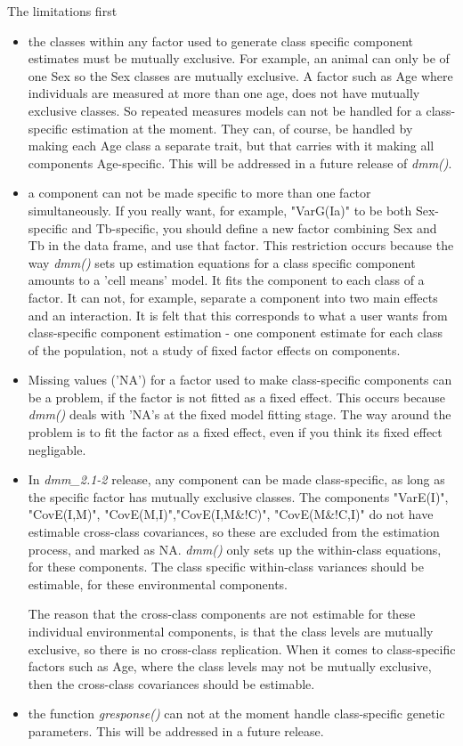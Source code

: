 \documentclass[titlepage]{article}  %
\begin{document}
The limitations first
\begin{itemize}
\item the classes within any factor used to generate class specific component estimates must be mutually exclusive. For example, an animal can only be of one Sex so the Sex classes are mutually exclusive. A factor such as Age where individuals are measured at more than one age, does not have mutually exclusive classes. So repeated measures models can not be handled for a class-specific estimation at the moment. They can, of course, be handled by making each Age class a separate trait, but that carries with it making all components Age-specific.
This will be addressed in a future release of {\em dmm()}.
\item a component can not be made specific to more than one factor simultaneously. If you really want, for example, "VarG(Ia)" to be both Sex-specific and Tb-specific, you should define a new factor combining Sex and Tb in the data frame, and use that factor. This restriction occurs because the way {\em dmm()} sets up estimation equations for a class specific component amounts to a 'cell means' model. It fits the component to each class of a factor. It can not, for example, separate a component into two main effects and an interaction. It is felt that this corresponds to what a user wants from class-specific component estimation - one component estimate for each class of the population, not a study of fixed factor effects on components.
\item Missing values ('NA') for a factor used to make class-specific components can be a problem, if the factor is not fitted as a fixed effect. This occurs because {\em dmm()} deals with 'NA's at the fixed model fitting stage. The way around the problem is to fit the factor as a fixed effect, even if you think its fixed effect negligable.
\item In {\em dmm\_2.1-2} release, any component can be made class-specific, as long as the specific factor has mutually exclusive classes. The components "VarE(I)",  "CovE(I,M)", "CovE(M,I)","CovE(I,M\&!C)", "CovE(M\&!C,I)" do not have estimable cross-class covariances, so these are excluded from the estimation process, and marked as NA.  {\em dmm()} only sets up  the within-class equations, for these components. The class specific within-class variances should be estimable, for these environmental components.

   The reason that the cross-class components are not estimable for these individual environmental components, is that the class levels are mutually exclusive, so there is no cross-class replication. When it comes to class-specific factors such as Age, where the class levels may not be mutually exclusive, then the cross-class covariances should be estimable. 
\item the function {\em gresponse()} can not at the moment handle class-specific genetic parameters. This will be addressed in a future release.
\end{itemize}
 
\end{document}
